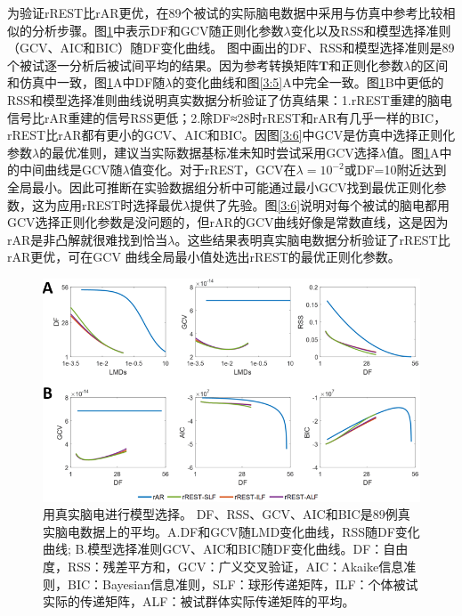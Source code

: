 为验证rREST比rAR更优，在89个被试的实际脑电数据中采用与仿真中参考比较相似的分析步骤。图\ref{3:8}中表示DF和GCV随正则化参数$\lambda$变化以及RSS和模型选择准则（GCV、AIC和BIC）随DF变化曲线。
图中画出的DF、RSS和模型选择准则是89个被试逐一分析后被试间平均的结果。因为参考转换矩阵$\mathbf{T}$和正则化参数$\lambda$的区间和仿真中一致，图\ref{3:8}A中DF随$\lambda$的变化曲线和图\ref{3:5}A中完全一致。图\ref{3:8}B中更低的RSS和模型选择准则曲线说明真实数据分析验证了仿真结果：1.rREST重建的脑电信号比rAR重建的信号RSS更低；2.除DF≈28时rREST和rAR有几乎一样的BIC，
rREST比rAR都有更小的GCV、AIC和BIC。因图\ref{3:6}中GCV是仿真中选择正则化参数$\lambda$的最优准则，建议当实际数据基标准未知时尝试采用GCV选择$\lambda$值。图\ref{3:8}A中的中间曲线是GCV随$\lambda$值变化。对于rREST，GCV在$\lambda=10^{-2}$或DF=10附近达到全局最小。因此可推断在实验数据组分析中可能通过最小GCV找到最优正则化参数，这为应用rREST时选择最优$\lambda$提供了先验。图\ref{3:6}说明对每个被试的脑电都用GCV选择正则化参数是没问题的，但rAR的GCV曲线好像是常数直线，这是因为rAR是非凸解就很难找到恰当$\lambda$。这些结果表明真实脑电数据分析验证了rREST比rAR更优，可在GCV
曲线全局最小值处选出rREST的最优正则化参数。
\begin{figure}[!h]
	\centering
	\includegraphics[width=15cm]{pic/Frontier/figure8.png}
	\caption{用真实脑电进行模型选择。 DF、RSS、GCV、AIC和BIC是89例真实脑电数据上的平均。A.DF和GCV随LMD变化曲线，RSS随DF变化曲线; B.模型选择准则GCV、AIC和BIC随DF变化曲线。DF：自由度，RSS：残差平方和，GCV：广义交叉验证，AIC：Akaike信息准则，BIC：Bayesian信息准则，SLF：球形传递矩阵，ILF：个体被试实际的传递矩阵，ALF：被试群体实际传递矩阵的平均。}
	\label{3:8}
\end{figure}

